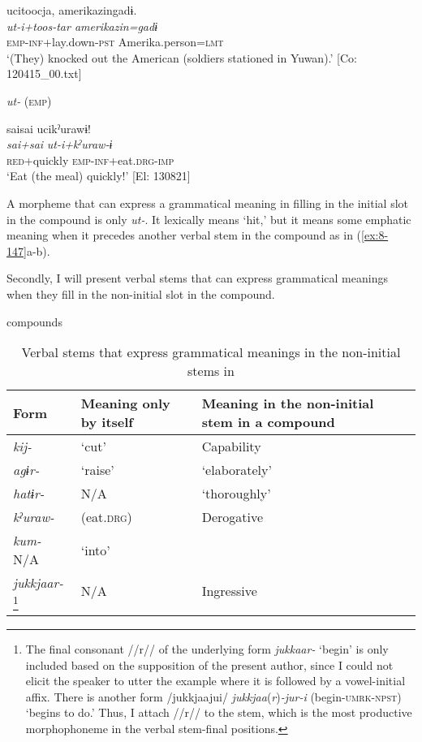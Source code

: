 {\TM}
\glll  ucitoocja,  {\textbar}amerikazin{\textbar}gadɨ.\\
\textit{ut-i+toos-tar  amerikazin=gadɨ}\\
\textsc{emp}-\textsc{inf}+lay.down-\textsc{pst}  Amerika.person=\textsc{lmt}\\
\glt ‘(They) knocked out the American (soldiers stationed in Yuwan).’ [Co: 120415\_00.txt]

\ex \textit{ut-} (\textsc{emp})

{\TM}
\glll  saisai  ucikˀurawɨ!\\
\textit{sai+sai}  \textit{ut-i+kˀuraw-ɨ}\\
\textsc{red}+quickly  \textsc{emp}-\textsc{inf}+eat.\textsc{drg}-\textsc{imp}\\
\glt ‘Eat (the meal) quickly!’ [El: 130821]
\z
\z

A morpheme that can express a grammatical meaning in filling in the initial slot in the compound is only \textit{ut-}. It lexically means ‘hit,’ but it means some emphatic meaning when it precedes another verbal stem in the compound as in (\ref{ex:8-147}a-b).

  Secondly, I will present verbal stems that can express grammatical meanings when they fill in the non-initial slot in the compound.

\begin{table}
\caption{\label{tab:key:87}Verbal stems that express grammatical meanings in the non-initial stems in} \textmd{compounds}

\begin{tabular}{lll}
  \lsptoprule
Form    & Meaning only by itself    & Meaning in the non-initial stem in a compound\\
\midrule
\textit{kij-}    & ‘cut’   &  Capability                         \\
\textit{agɨr-}   &‘raise’&  ‘elaborately’                  \\
\textit{hatɨr-}  &  N/A&  ‘thoroughly’                       \\
\textit{kˀuraw-} &   (eat.\textsc{drg})   &  Derogative          \\
\textit{kum-}    N/A&  ‘into’                               \\
\textit{jukkjaar-}\footnote{The final consonant //r// of the underlying form \textit{jukkaar-} ‘begin’ is only included based on the supposition of the present author, since I could not elicit the speaker to utter the example where it is followed by a vowel-initial affix. There is another form /jukkjaajui/ \textit{jukkjaa}(\textit{r})\textit{-jur-i} (begin-\textsc{umrk}-\textsc{npst}) ‘begins to do.’ Thus, I attach //r// to the stem, which is the most productive morphophoneme in the verbal stem-final positions.}  &  N/A &   Ingressive\\
\lspbottomrule
\end{tabular}
\end{table}

